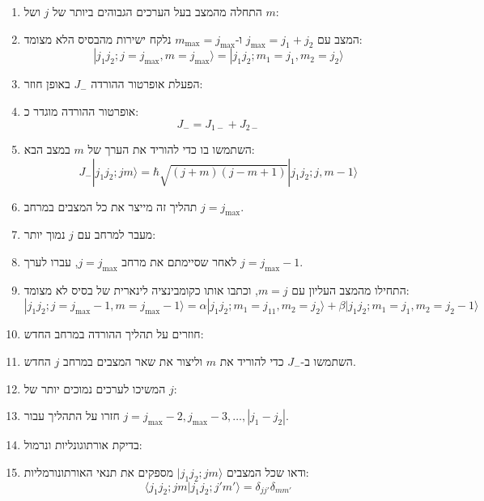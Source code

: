\documentclass{tstextbook}
\begin{document}
\begin{proposition}
  \begin{enumerate}
    \item התחלה מהמצב בעל הערכים הגבוהים ביותר של \(j\) ושל \(m\): 
    \item המצב עם \(j_{\text{max}}=j_1+j_2\) ו-\(m_{\text{max}}=j_{\text{max}}\) נלקח ישירות מהבסיס הלא מצומד:
$$|j_1j_2;j=j_{\text{max}},m=j_{\text{max}}\rangle=|j_1j_2;m_1=j_1,m_2=j_2\rangle$$


    \item הפעלת אופרטור ההורדה \(J_-\) באופן חוזר: 


    \item אופרטור ההורדה מוגדר כ:
$$J_-=J_{1-}+J_{2-}$$
    \item השתמשו בו כדי להוריד את הערך של \(m\) במצב הבא:
     $$     J_-|j_1j_2;jm\rangle=\hbar\sqrt{(j+m)(j-m+1)}|j_1j_2;j,m-1\rangle
     $$
    \item תהליך זה מייצר את כל המצבים במרחב \(j=j_{\text{max}}\).


    \item מעבר למרחב עם \(j\) נמוך יותר: 


    \item לאחר שסיימתם את מרחב \(j=j_{\text{max}}\), עברו לערך \(j=j_{\text{max}}-1\).
    \item התחילו מהמצב העליון עם \(m=j\), וכתבו אותו כקומבינציה לינארית של בסיס לא מצומד:
$$|j_1j_2;j=j_{\text{max}}-1,m=j_{\text{max}}-1\rangle=\alpha|j_1j_2;m_1=j_11,m_2=j_2\rangle+\beta|j_1j_2;m_1=j_1,m_2=j_2-1\rangle     $$


    \item חוזרים על תהליך ההורדה במרחב החדש: 


    \item השתמשו ב-\(J_-\) כדי להוריד את \(m\) וליצור את שאר המצבים במרחב \(j\) החדש.


    \item המשיכו לערכים נמוכים יותר של \(j\): 


    \item חזרו על התהליך עבור \(j=j_{\text{max}}-2,j_{\text{max}}-3,\dots,|j_1-j_2|\).


    \item בדיקת אורתוגונליות ונרמול: 


    \item ודאו שכל המצבים \(|j_1j_2;jm\rangle\) מספקים את תנאי האורתונורמליות:
$$     \langle j_1j_2;jm|j_1j_2;j'm'\rangle=\delta_{jj'}\delta_{mm'}     $$
  \end{enumerate}
\end{proposition}
\end{document}
